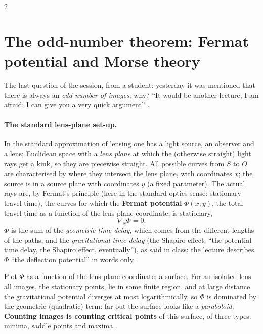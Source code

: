 \begin{paracol}{2}
\section{The odd-number theorem: Fermat potential and Morse theory}\label{sec:c17-morse}

The last question of the session, from a student: yesterday it was mentioned that there is always an \emph{odd number of images}; why? ``It would be another lecture, I am afraid; I can give you a very quick argument'' .

\paragraph{The standard lens-plane set-up.} In the standard approximation of lensing one has a light source, an observer and a lens; Euclidean space with a \emph{lens plane} at which the (otherwise straight) light rays get a kink, so they are piecewise straight. All possible curves from $S$ to $O$ are characterised by where they intersect the lens plane, with coordinates $x$; the source is in a source plane with coordinates $y$ (a fixed parameter). The actual rays are, by Fermat's principle (here in the standard optics sense: stationary travel time), the curves for which the \textbf{Fermat potential} $\Phi(x;y)$, the total travel time as a function of the lens-plane coordinate, is stationary,
\[
  \nabla_x\Phi=0.
\]
$\Phi$ is the sum of the \emph{geometric time delay}, which comes from the different lengths of the paths, and the \emph{gravitational time delay} (the Shapiro effect: ``the potential time delay, the Shapiro effect, eventually''), as said in class: the lecture describes $\Phi$ ``the deflection potential'' in words only .

Plot $\Phi$ as a function of the lens-plane coordinate: a surface. For an isolated lens all images, the stationary points, lie in some finite region, and at large distance the gravitational potential diverges at most logarithmically, so $\Phi$ is dominated by the geometric (quadratic) term: far out the surface looks like a \emph{paraboloid}. \textbf{Counting images is counting critical points} of this surface, of three types: minima, saddle points and maxima .


\end{paracol}
